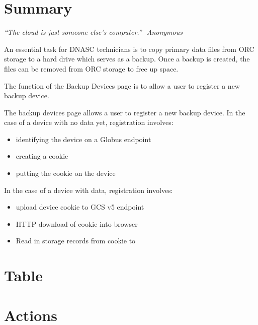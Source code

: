
\section{Summary}

\emph{``The cloud is just someone else's computer.'' -Anonymous}

An essential task for DNASC technicians is to copy primary data files from 
ORC storage to a hard drive which serves as a backup. Once a backup is created,
the files can be removed from ORC storage to free up space. 

The function of the Backup Devices page is to allow a user to register a 
new backup device. 


\noindent The backup devices page allows a user to register a new backup device.
In the case of a device with no data yet, registration involves:
\begin{itemize}
    \item identifying the device on a Globus endpoint
    \item creating a cookie
    \item putting the cookie on the device
\end{itemize}

\noindent In the case of a device with data, registration involves:
\begin{itemize}
    \item upload device cookie to GCS v5 endpoint
    \item HTTP download of cookie into browser
    \item Read in storage records from cookie to 
\end{itemize}

\section{Table}
\section{Actions}
